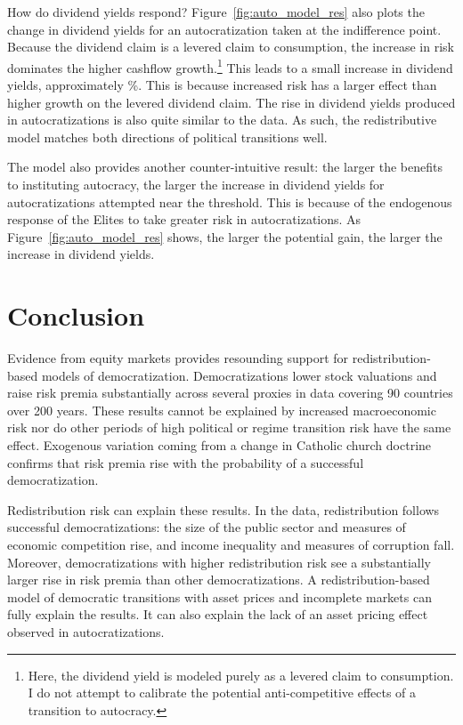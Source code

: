 \documentclass[12pt]{article}
\numberwithin{equation}{section}
\begin{document}
How do dividend yields respond? Figure~\ref{fig:auto_model_res} also plots the change in dividend yields for an autocratization taken at the indifference point. Because the dividend claim is a levered claim to consumption, the increase in risk dominates the higher cashflow growth.\footnote{Here, the dividend yield is modeled purely as a levered claim to consumption. I do not attempt to calibrate the potential anti-competitive effects of a transition to autocracy.} This leads to a small increase in dividend yields, approximately \autoDivYldChange\%. This is because increased risk has a larger effect than higher growth on the levered dividend claim. The rise in dividend yields produced in autocratizations is also quite similar to the data. As such, the redistributive model matches both directions of political transitions well.

The model also provides another counter-intuitive result: the larger the benefits to instituting autocracy, the larger the increase in dividend yields for autocratizations attempted near the threshold. This is because of the endogenous response of the Elites to take greater risk in autocratizations. As Figure~\ref{fig:auto_model_res} shows, the larger the potential gain, the larger the increase in dividend yields.


\section{Conclusion}\label{section:conc}

Evidence from equity markets provides resounding support for redistribution-based models of democratization. Democratizations lower stock valuations and raise risk premia substantially across several proxies in data covering 90 countries over 200 years. These results cannot be explained by increased macroeconomic risk nor do other periods of high political or regime transition risk have the same effect. Exogenous variation coming from a change in Catholic church doctrine confirms that risk premia rise with the probability of a successful democratization. 

Redistribution risk can explain these results. In the data, redistribution follows successful democratizations: the size of the public sector and measures of economic competition rise, and income inequality and measures of corruption fall.  Moreover, democratizations with higher redistribution risk see a substantially larger rise in risk premia than other democratizations. A redistribution-based model of democratic transitions with asset prices and incomplete markets can fully explain the results. It can also explain the lack of an asset pricing effect observed in autocratizations.
\end{document}

